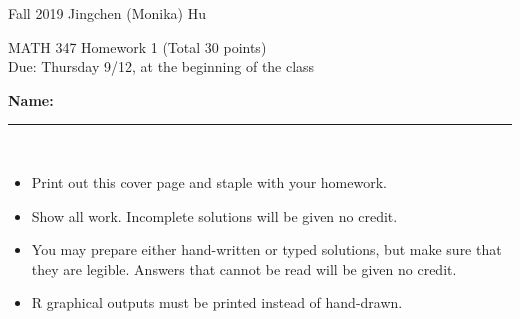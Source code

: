 \documentclass[11pt]{article}
\begin{document}
\enlargethispage{\baselineskip}

Fall 2019 \hfill Jingchen (Monika) Hu\\

\begin{center}
{\huge MATH 347 Homework 1 (Total 30 points)}	\\
Due: Thursday 9/12, at the beginning of the class
\end{center}
\vspace{0.5cm}

\textbf{Name:} \rule{6cm}{0.5pt}\\


{\bf
\begin{itemize}
\item Print out this cover page and staple with your homework.
\item Show all work. Incomplete solutions will be given no credit.
\item You may prepare either hand-written or typed solutions,
but make sure that they are legible.
Answers that cannot be read will be given no credit.
\item R graphical outputs must be printed instead of hand-drawn.

\end{itemize}
}

\vspace{5mm}
\end{document}
